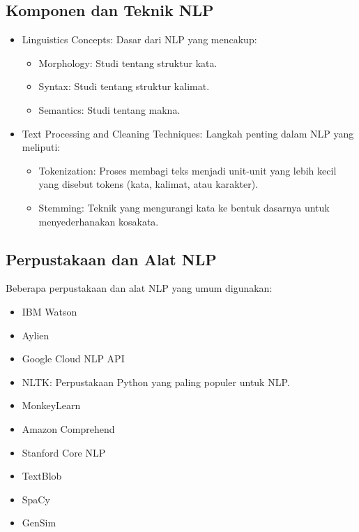 \documentclass{article}
\begin{document}
\subsection{Komponen dan Teknik NLP}
\begin{itemize}
    \item Linguistics Concepts: Dasar dari NLP yang mencakup:
          \begin{itemize}
              \item Morphology: Studi tentang struktur kata.
              \item Syntax: Studi tentang struktur kalimat.
              \item Semantics: Studi tentang makna.
          \end{itemize}
    \item Text Processing and Cleaning Techniques: Langkah penting dalam NLP yang meliputi:
          \begin{itemize}
              \item Tokenization: Proses membagi teks menjadi unit-unit yang lebih kecil yang disebut tokens (kata, kalimat, atau karakter).
              \item Stemming: Teknik yang mengurangi kata ke bentuk dasarnya untuk menyederhanakan kosakata.
          \end{itemize}
\end{itemize}

\subsection{Perpustakaan dan Alat NLP}
Beberapa perpustakaan dan alat NLP yang umum digunakan:
\begin{itemize}
    \item IBM Watson
    \item Aylien
    \item Google Cloud NLP API
    \item NLTK: Perpustakaan Python yang paling populer untuk NLP.
    \item MonkeyLearn
    \item Amazon Comprehend
    \item Stanford Core NLP
    \item TextBlob
    \item SpaCy
    \item GenSim
\end{itemize}
\end{document}
